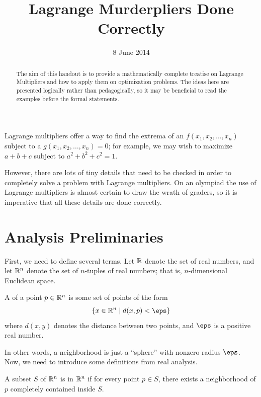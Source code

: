 \documentclass[11pt]{scrartcl}
\begin{document}
\title{Lagrange Murderpliers Done Correctly}
\date{8 June 2014}
\maketitle

\begin{abstract}
  The aim of this handout is to provide a mathematically complete treatise
  on Lagrange Multipliers and how to apply them on optimization problems.
  The ideas here are presented logically rather than pedagogically,
  so it may be beneficial to read the examples before the formal statements.
\end{abstract}

Lagrange multipliers offer a way to find the extrema
of an  $f(x_1, x_2, \dots, x_n)$ subject to a
 $g(x_1, x_2, \dots, x_n) = 0$;
for example, we may wish to maximize $a+b+c$ subject to $a^2+b^2+c^2=1$.

However, there are lots of tiny details that need to be checked in order
to completely solve a problem with Lagrange multipliers.
On an olympiad the use of Lagrange multipliers is almost certain to
draw the wrath of graders,
so it is imperative that all these details are done correctly.

\section{Analysis Preliminaries}
First, we need to define several terms.
Let $\mathbb R$ denote the set of real numbers,
and let $\mathbb R^n$ denote the set of $n$-tuples of real numbers;
that is, $n$-dimensional Euclidean space.

\begin{definition}
  A  of a point $p \in \mathbb R^n$ is some set of points of the form
  \[ \left\{ x \in \RR^n \mid d(x,p) < \eps \right\} \]
  where $d(x,y)$ denotes the distance between two points, and $\eps$ is a positive real number.
\end{definition}
In other words, a neighborhood is just a ``sphere'' with nonzero radius $\eps$.
Now, we need to introduce some definitions from real analysis.

\begin{definition}
  A subset $S$ of $\mathbb R^n$ is  in $\mathbb R^n$ if for every point $p \in S$,
  there exists a neighborhood of $p$ completely contained inside $S$.
\end{definition}
\end{document}
